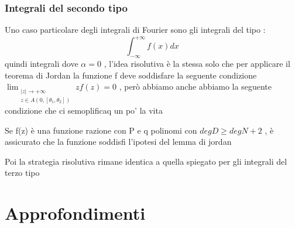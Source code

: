 \documentclass{article}
\theoremstyle{definition}
\newcommand{\intinf}{\int_{-\infty}^{+\infty}}
\begin{document}
\subsubsection{Integrali del secondo tipo}
Uno caso particolare degli integrali di Fourier sono gli integrali del tipo : 
$$\intinf f(x)dx$$ quindi integrali dove $\alpha=0$ , l'idea risolutiva è la stessa solo che per applicare il teorema di Jordan la funzione f deve soddisfare la seguente condizione  $\lim_{\substack{|z| \to +\infty \\ z \in A(0, [\theta_1, \theta_2])}}zf(z)=0$ , però abbiamo anche abbiamo la seguente condizione che ci semoplificaq un po' la vita 
\begin{tcolorbox}
	Se f(z) è una funzione razione con P e q polinomi con $deg D \geq deg N+2$ , è assicurato che la funzione soddisfi l'ipotesi del lemma di jordan 
\end{tcolorbox}
Poi la strategia risolutiva rimane identica a quella spiegato per gli integrali del terzo tipo 




































\newpage
\section{Approfondimenti}
\end{document}
